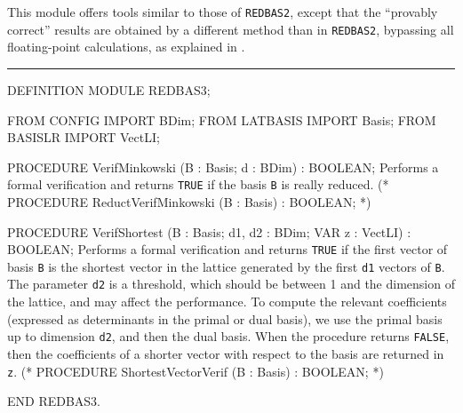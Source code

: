 
This module offers tools similar to those of {\tt REDBAS2},
except that the ``provably correct'' results are obtained by a
different method than in {\tt REDBAS2}, bypassing all floating-point
calculations, as explained in \cite{rCOU96x}.

\bigskip\hrule
\code

DEFINITION MODULE REDBAS3;

FROM CONFIG   IMPORT BDim;
FROM LATBASIS IMPORT Basis;
FROM BASISLR  IMPORT VectLI;

PROCEDURE VerifMinkowski (B : Basis;  d : BDim) : BOOLEAN;
\endcode
  \tab  Performs a formal verification and 
   returns {\tt TRUE} if the basis {\tt B} is really reduced. \endtab
\code
\hide (*
PROCEDURE ReductVerifMinkowski (B : Basis) : BOOLEAN;
*)  \endhide

PROCEDURE VerifShortest (B : Basis; d1, d2 : BDim; VAR z : VectLI) : BOOLEAN;
\endcode
   \tab  Performs a formal verification and
   returns {\tt TRUE} if the first vector of basis {\tt B}
   is the shortest vector in the lattice generated by the first {\tt d1}
   vectors of {\tt B}.   The parameter {\tt d2} is a threshold,
   which should be between 1 and the dimension of the lattice,
   and may affect the performance.  To compute the relevant
   coefficients (expressed as determinants in the primal or dual basis),
   we use the primal basis up to dimension {\tt d2}, and then the
   dual basis.   When the procedure returns {\tt FALSE}, then the
   coefficients of a shorter vector with respect to the basis are
   returned in {\tt z}.
   \endtab
\code\hide
(*
PROCEDURE ShortestVectorVerif (B : Basis) : BOOLEAN;
*)
\endhide

END REDBAS3.
\endcode
